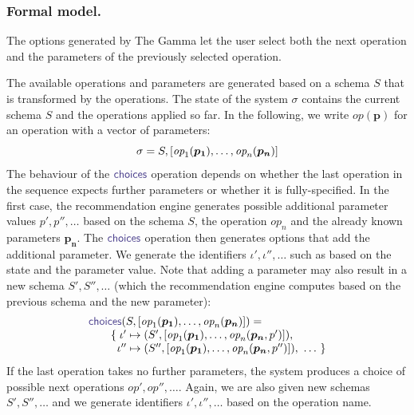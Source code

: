 \documentclass[nonacm,anonymous,sigplan,screen]{acmart}
\newcommand{\ident}[1]{\textsf{\color{DarkSlateBlue}{#1}}}
\newcommand{\ddident}[1]{\guillemotleft\ident{#1}\guillemotright}
\newcommand{\choices}{\textnormal{\ident{choices}}}
\newcommand{\op}{\textit{op}}
\newcommand{\vect}[1]{\lbrack #1 \rbrack}
\begin{document}
\subsubsection*{Formal model.}
The options generated by The Gamma let the user select both the next operation and the parameters
of the previously selected operation.

The available operations and parameters are generated
based on a schema $S$ that is transformed by the operations. The state of the system $\sigma$
contains the current schema $S$ and the operations applied so far. In the following, we write
$\op(\boldsymbol{p})$ for an operation with a vector of parameters:
\[
\sigma = S, \vect{\op_1(\boldsymbol{p_1}), \ldots, \op_n(\boldsymbol{p_n})}\\
\]
The behaviour of the $\choices$ operation depends on whether the last operation in the sequence
expects further parameters or whether it is fully-specified. In the first case, the recommendation
engine generates possible additional parameter values $p', p'', \ldots$ based on the schema $S$,
the operation $\op_n$ and the already known parameters $\boldsymbol{p_n}$.
The $\choices$ operation then generates options that add the additional parameter. We generate the
identifiers $\iota',\iota'',\ldots$ such as \ddident{by Gold descending} based on the state and the
parameter value. Note that adding a parameter may also result in a new schema
$S', S'', \ldots$ (which the recommendation engine computes based on the previous schema and the new parameter):
\[
\begin{array}{l}
\choices(S, \vect{\op_1(\boldsymbol{p_1}), \ldots, \op_n(\boldsymbol{p_n})}) =\\
\qquad \{\; \iota' \mapsto (S', \vect{\op_1(\boldsymbol{p_1}), \ldots, \op_n(\boldsymbol{p_n},p')}), \\
\qquad\;\;    \iota'' \mapsto (S'', \vect{\op_1(\boldsymbol{p_1}), \ldots, \op_n(\boldsymbol{p_n},p'')}), ~\ldots~\}
\end{array}
\]
If the last operation takes no further parameters, the system produces a choice
of possible next operations $\op', \op'', \ldots$. Again, we are also given new schemas $S', S'', \ldots$
and we generate identifiers $\iota',\iota'',\ldots$ based on the operation name.
\end{document}
